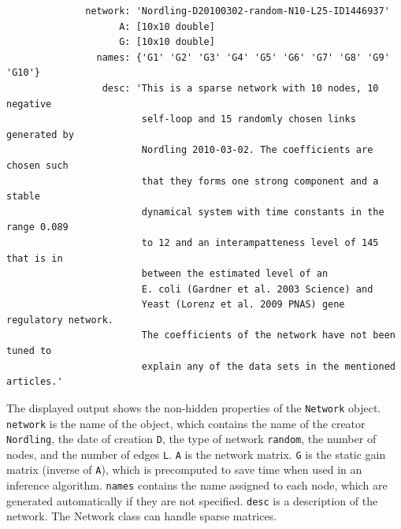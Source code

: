 \begin{bibunit}
\begin{verbatim}
              network: 'Nordling-D20100302-random-N10-L25-ID1446937'
                    A: [10x10 double]
                    G: [10x10 double]
                names: {'G1' 'G2' 'G3' 'G4' 'G5' 'G6' 'G7' 'G8' 'G9' 'G10'}
                 desc: 'This is a sparse network with 10 nodes, 10 negative
                        self-loop and 15 randomly chosen links generated by
                        Nordling 2010-03-02. The coefficients are chosen such
                        that they forms one strong component and a stable
                        dynamical system with time constants in the range 0.089
                        to 12 and an interampatteness level of 145 that is in
                        between the estimated level of an
                        E. coli (Gardner et al. 2003 Science) and
                        Yeast (Lorenz et al. 2009 PNAS) gene regulatory network.
                        The coefficients of the network have not been tuned to
                        explain any of the data sets in the mentioned articles.'
\end{verbatim}
The displayed output shows the non-hidden properties of the \texttt{Network} object.
\texttt{network} is the name of the object, which contains the name of the creator \texttt{Nordling}, the date of creation \texttt{D}, the type of network \texttt{random}, the number of nodes, and the number of edges \texttt{L}.
\texttt{A} is the network matrix. \texttt{G} is the static gain matrix (inverse of \texttt{A}),
which is precomputed to save time when used in an inference algorithm.
\texttt{names} contains the name assigned to each node, which are generated automatically if they are not specified.
\texttt{desc} is a description of the network.
The Network class can handle sparse matrices.


\end{bibunit}
